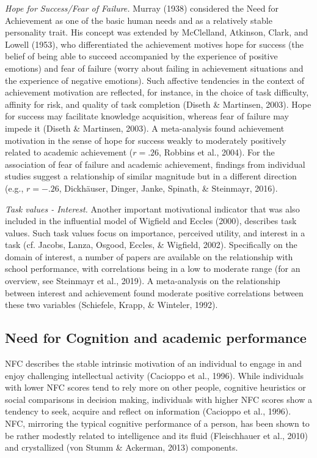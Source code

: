 \documentclass[
  man]{apa6}
\begin{document}
\emph{Hope for Success/Fear of Failure.} Murray (1938) considered the Need for Achievement as one of the basic human needs and as a relatively stable personality trait. His concept was extended by McClelland, Atkinson, Clark, and Lowell (1953), who differentiated the achievement motives hope for success (the belief of being able to succeed accompanied by the experience of positive emotions) and fear of failure (worry about failing in achievement situations and the experience of negative emotions). Such affective tendencies in the context of achievement motivation are reflected, for instance, in the choice of task difficulty, affinity for risk, and quality of task completion (Diseth \& Martinsen, 2003). Hope for success may facilitate knowledge acquisition, whereas fear of failure may impede it (Diseth \& Martinsen, 2003). A meta-analysis found achievement motivation in the sense of hope for success weakly to moderately positively related to academic achievement (\(r=.26\), Robbins et al., 2004). For the association of fear of failure and academic achievement, findings from individual studies suggest a relationship of similar magnitude but in a different direction (e.g., \(r=-.26\), Dickhäuser, Dinger, Janke, Spinath, \& Steinmayr, 2016).

\emph{Task values - Interest.} Another important motivational indicator that was also included in the influential model of Wigfield and Eccles (2000), describes task values. Such task values focus on importance, perceived utility, and interest in a task (cf. Jacobs, Lanza, Osgood, Eccles, \& Wigfield, 2002). Specifically on the domain of interest, a number of papers are available on the relationship with school performance, with correlations being in a low to moderate range (for an overview, see Steinmayr et al., 2019). A meta-analysis on the relationship between interest and achievement found moderate positive correlations between these two variables (Schiefele, Krapp, \& Winteler, 1992).

\hypertarget{need-for-cognition-and-academic-performance}{%
\subsection{Need for Cognition and academic performance}\label{need-for-cognition-and-academic-performance}}

NFC describes the stable intrinsic motivation of an individual to engage in and enjoy challenging intellectual activity (Cacioppo et al., 1996). While individuals with lower NFC scores tend to rely more on other people, cognitive heuristics or social comparisons in decision making, individuals with higher NFC scores show a tendency to seek, acquire and reflect on information (Cacioppo et al., 1996). NFC, mirroring the typical cognitive performance of a person, has been shown to be rather modestly related to intelligence and its fluid (Fleischhauer et al., 2010) and crystallized (von Stumm \& Ackerman, 2013) components.
\end{document}
